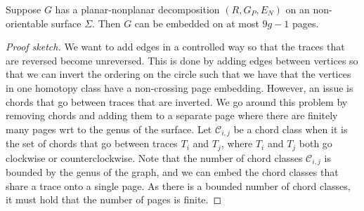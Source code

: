 \begin{lemma}\label{lem:planar_nonplanar_nonorientable}
	Suppose $G$ has a planar-nonplanar decomposition $(R, G_P, E_N)$ on an non-orientable surface $\Sigma$. Then $G$ can be embedded on at most $9g - 1$ pages.
\end{lemma}
\begin{proof}[Proof sketch]
	We want to add edges in a controlled way so that the traces that are reversed become unreversed. This is done by adding edges between vertices so that we can invert the ordering on the circle such that we have that the vertices in one homotopy class have a non-crossing page embedding. However, an issue is chords that go between traces that are inverted. We go around this problem by removing chords and adding them to a separate page where there are finitely many pages wrt to the genus of the surface. Let $\mathcal{C}_{i,j}$ be a chord class when it is the set of chords that go between traces $T_i$ and $T_j$, where $T_i$ and $T_j$ both go clockwise or counterclockwise. Note that the number of chord classes $\mathcal{C}_{i,j}$ is bounded by the genus of the graph, and we can embed the chord classes that share a trace onto a single page. As there is a bounded number of chord classes, it must hold that the number of pages is finite. 
\end{proof}